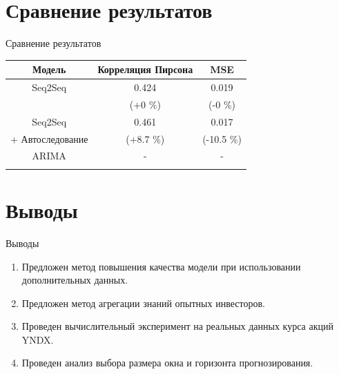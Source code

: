 \documentclass[10pt,pdf,hyperref={unicode}]{beamer}
\begin{document}
\section{Сравнение результатов}
\begin{frame}{Сравнение результатов}

\begin{table}[h!t]
\begin{center}
\begin{tabular}{|c|c|c|}
\hline
        \multicolumn{1}{|c|}{Модель} 
        & Корреляция Пирсона & MSE \\
        \hline
        \hline
        Seq2Seq & 0.424 & 0.019 \\
        & (+0 \%) & (-0 \%) \\
        \hline
        Seq2Seq & 0.461 & 0.017 \\
        + Автоследование & (+8.7 \%) & (-10.5 \%) \\
        \hline
        ARIMA & - & - \\
        &  &  \\
\hline
\end{tabular}
\end{center}
\end{table}

\end{frame}


\section{Выводы}
\begin{frame}{Выводы}

\begin{enumerate}
    \item Предложен метод повышения качества модели при использовании дополнительных данных.
    \item Предложен метод агрегации знаний опытных инвесторов.
    \item Проведен вычислительный эксперимент на реальных данных курса акций YNDX.
    \item Проведен анализ выбора размера окна и горизонта прогнозирования.
\end{enumerate}
 
\end{frame}

\end{document}
